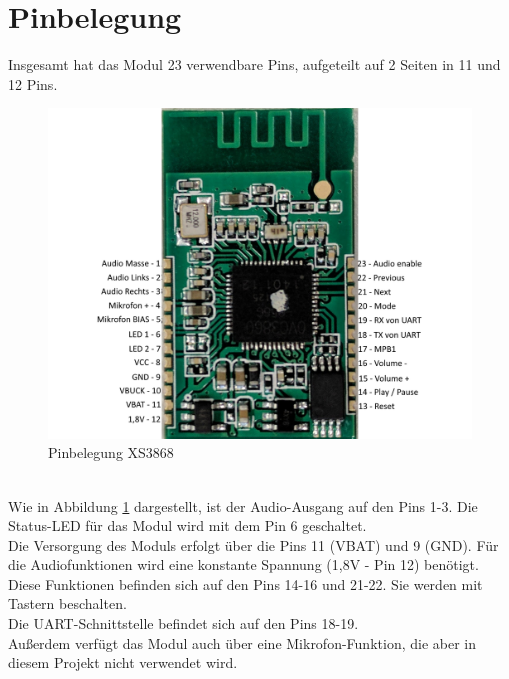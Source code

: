 \section{Pinbelegung}
Insgesamt hat das Modul 23 verwendbare Pins, aufgeteilt auf 2 Seiten in 11 und 12 Pins.
\begin{figure} [h]
	\centering
	\caption{Pinbelegung XS3868}
	\label {fig:abb2.2}
	\includegraphics[width=1\textwidth]{img/XS3868_Pinbelegung.png}
\end{figure}\\
Wie in Abbildung \ref{fig:abb2.2} dargestellt, ist der Audio-Ausgang auf den Pins 1-3. Die Status-LED für das Modul wird mit dem Pin 6 geschaltet.\\
Die Versorgung des Moduls erfolgt über die Pins 11 (VBAT) und 9 (GND). Für die Audiofunktionen wird eine konstante Spannung (1,8V - Pin 12) benötigt. Diese Funktionen befinden sich auf den Pins 14-16 und 21-22. Sie werden mit Tastern beschalten.\\
Die UART-Schnittstelle befindet sich auf den Pins 18-19.\\
Außerdem verfügt das Modul auch über eine Mikrofon-Funktion, die aber in diesem Projekt nicht verwendet wird.


